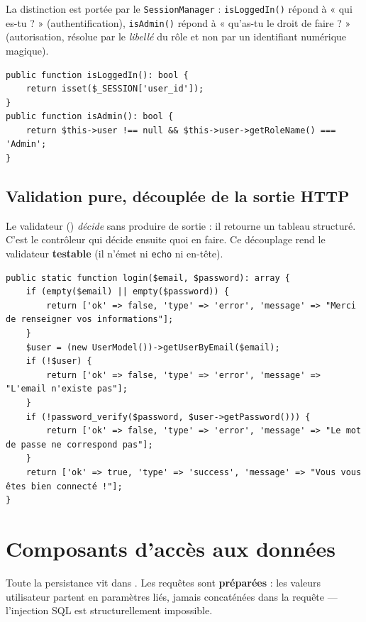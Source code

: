 La distinction est portée par le \texttt{SessionManager} : \texttt{isLoggedIn()} répond à « qui
es-tu ? » (authentification), \texttt{isAdmin()} répond à « qu'as-tu le droit de faire ? »
(autorisation, résolue par le \emph{libellé} du rôle et non par un identifiant numérique
magique).

\begin{lstlisting}[style=php, caption={Authentification et autorisation — \file{src/SessionManager.php}}]
public function isLoggedIn(): bool {
    return isset($_SESSION['user_id']);
}
public function isAdmin(): bool {
    return $this->user !== null && $this->user->getRoleName() === 'Admin';
}
\end{lstlisting}

\subsection{Validation pure, découplée de la sortie HTTP}

Le validateur () \emph{décide} sans produire de
sortie : il retourne un tableau structuré. C'est le contrôleur qui décide ensuite quoi en faire.
Ce découplage rend le validateur \textbf{testable} (il n'émet ni \texttt{echo} ni en-tête).

\begin{lstlisting}[style=php, caption={Validation pure (retourne un tableau) — \file{UserValidator.php}}]
public static function login($email, $password): array {
    if (empty($email) || empty($password)) {
        return ['ok' => false, 'type' => 'error', 'message' => "Merci de renseigner vos informations"];
    }
    $user = (new UserModel())->getUserByEmail($email);
    if (!$user) {
        return ['ok' => false, 'type' => 'error', 'message' => "L'email n'existe pas"];
    }
    if (!password_verify($password, $user->getPassword())) {
        return ['ok' => false, 'type' => 'error', 'message' => "Le mot de passe ne correspond pas"];
    }
    return ['ok' => true, 'type' => 'success', 'message' => "Vous vous êtes bien connecté !"];
}
\end{lstlisting}

\section{Composants d'accès aux données}
\label{sec:acces}

Toute la persistance vit dans . Les requêtes sont \textbf{préparées} : les
valeurs utilisateur partent en paramètres liés, jamais concaténées dans la requête — l'injection
SQL est structurellement impossible.

